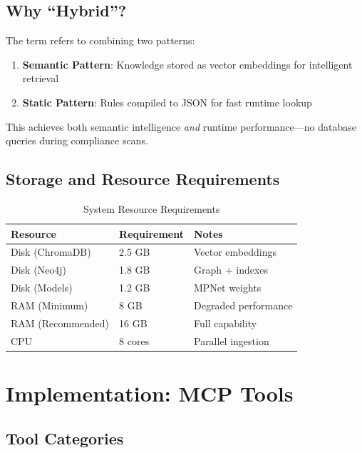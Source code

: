 \documentclass[11pt,letterpaper]{article}
\begin{document}
\subsection{Why ``Hybrid''?}

The term refers to combining two patterns:

\begin{enumerate}
    \item \textbf{Semantic Pattern}: Knowledge stored as vector embeddings for intelligent retrieval
    \item \textbf{Static Pattern}: Rules compiled to JSON for fast runtime lookup
\end{enumerate}

This achieves both semantic intelligence \textit{and} runtime performance---no database queries during compliance scans.

\subsection{Storage and Resource Requirements}

\begin{table}[H]
\centering
\caption{System Resource Requirements}
\begin{tabular}{@{}lll@{}}
\toprule
\textbf{Resource} & \textbf{Requirement} & \textbf{Notes} \\
\midrule
Disk (ChromaDB) & 2.5 GB & Vector embeddings \\
Disk (Neo4j) & 1.8 GB & Graph + indexes \\
Disk (Models) & 1.2 GB & MPNet weights \\
RAM (Minimum) & 8 GB & Degraded performance \\
RAM (Recommended) & 16 GB & Full capability \\
CPU & 8 cores & Parallel ingestion \\
\bottomrule
\end{tabular}
\end{table}

\section{Implementation: MCP Tools}

\subsection{Tool Categories}
\end{document}
